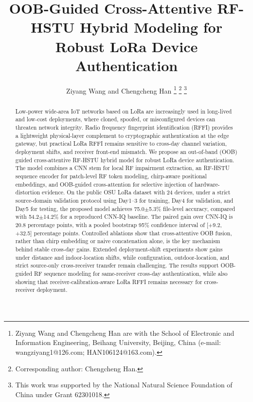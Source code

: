 \documentclass[journal]{IEEEtran}
\begin{document}
\title{OOB-Guided Cross-Attentive RF-HSTU Hybrid Modeling for Robust LoRa Device Authentication}

\author{Ziyang Wang and Chengcheng Han%
\thanks{Ziyang Wang and Chengcheng Han are with the School of Electronic and Information Engineering, Beihang University, Beijing, China (e-mail: wangziyang1@126.com; HAN106124@163.com).}
\thanks{Corresponding author: Chengcheng Han.}
\thanks{This work was supported by the National Natural Science Foundation of China under Grant 62301018.}}

\maketitle

\begin{abstract}
Low-power wide-area IoT networks based on LoRa are increasingly used in long-lived and low-cost deployments, where cloned, spoofed, or misconfigured devices can threaten network integrity.
Radio frequency fingerprint identification (RFFI) provides a lightweight physical-layer complement to cryptographic authentication at the edge gateway, but practical LoRa RFFI remains sensitive to cross-day channel variation, deployment shifts, and receiver front-end mismatch.
We propose an out-of-band (OOB) guided cross-attentive RF-HSTU hybrid model for robust LoRa device authentication.
The model combines a CNN stem for local RF impairment extraction, an RF-HSTU sequence encoder for patch-level RF token modeling, chirp-aware positional embeddings, and OOB-guided cross-attention for selective injection of hardware-distortion evidence.
On the public OSU LoRa dataset with 24 devices, under a strict source-domain validation protocol using Day1--3 for training, Day4 for validation, and Day5 for testing, the proposed model achieves 75.0$\pm$5.3\% file-level accuracy, compared with 54.2$\pm$14.2\% for a reproduced CNN-IQ baseline.
The paired gain over CNN-IQ is 20.8 percentage points, with a pooled bootstrap 95\% confidence interval of [+9.2, +32.5] percentage points.
Controlled ablations show that cross-attentive OOB fusion, rather than chirp embedding or naive concatenation alone, is the key mechanism behind stable cross-day gains.
Extended deployment-shift experiments show gains under distance and indoor-location shifts, while configuration, outdoor-location, and strict source-only cross-receiver transfer remain challenging.
The results support OOB-guided RF sequence modeling for same-receiver cross-day authentication, while also showing that receiver-calibration-aware LoRa RFFI remains necessary for cross-receiver deployment.
\end{abstract}
\end{document}

